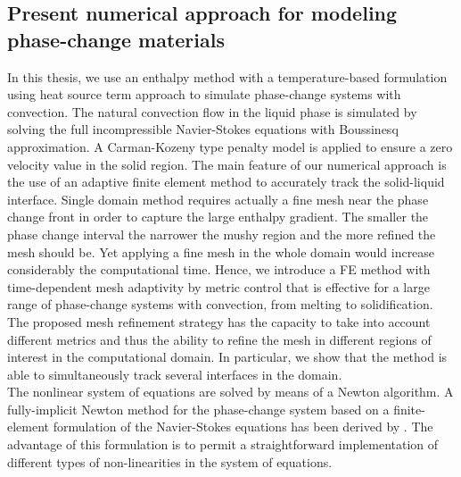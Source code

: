 \subsection{Present numerical approach for modeling phase-change materials}
In this thesis, we use an enthalpy method with a temperature-based formulation using heat source term approach to simulate phase-change systems with convection.
The natural convection flow in the liquid phase is simulated by solving the full incompressible Navier-Stokes equations with Boussinesq approximation.
A Carman-Kozeny type penalty model is applied to ensure a zero velocity value in the solid region.
The main feature of our numerical approach is the use of an adaptive finite element method to accurately track the solid-liquid interface.
Single domain method requires actually a fine mesh near the phase change front in order to capture the large enthalpy gradient. 
The smaller the phase change interval the narrower the mushy region and the more refined the mesh should be.
Yet applying a fine mesh in the whole domain would increase considerably the computational time.
Hence, we introduce a FE method with time-dependent mesh adaptivity by metric control that is  effective for a large range of phase-change systems with convection, from melting to solidification. The proposed mesh refinement strategy has the capacity to take into account different metrics and thus the ability to refine the mesh in different regions of interest in the computational domain. In particular, we show that the method is able to simultaneously track several interfaces in the domain.\\ %
The nonlinear system of equations are solved by means of a Newton algorithm.
A fully-implicit Newton method for the phase-change system based on a finite-element formulation of the Navier-Stokes equations has been derived by \citep{dan-2014-JCP}.
The advantage of this formulation is to  permit a straightforward implementation of different types of non-linearities in the system of equations.

